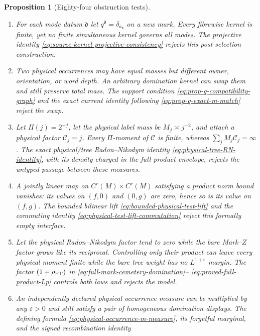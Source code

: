 \documentclass[11pt]{article}
\newtheorem{proposition}[theorem]{Proposition}
\begin{document}
\begin{proposition}[Eighty-four obstruction tests]
\begin{enumerate}[label=\textup{(T\arabic*)}]
      not a bounded product test.  The uniform lift
      \eqref{eq:bounded-physical-test-lift} rejects this model.
\item For each mode datum $\mathfrak d$ let
      $q^{\mathfrak d}=\delta_{a_{\mathfrak d}}$ on a new mark.  Every
      fibrewise kernel is finite, yet no finite simultaneous kernel governs
      all modes.  The projective identity
      \eqref{eq:source-kernel-projective-consistency} rejects this
      post-selection construction.
\item Two physical occurrences may have equal masses but different owner,
      orientation, or word depth.  An arbitrary domination kernel can swap
      them and still preserve total mass.  The support condition
      \eqref{eq:prop-q-compatibility-graph} and the exact current identity
      following \eqref{eq:prop-q-exact-m-match} reject the swap.
\item Let $\Pi(j)=2^{-j}$, let the physical label mass be
      $M_j\asymp j^{-2}$, and attach a physical factor $\mathcal C_j=j$.
      Every $\Pi$-moment of $\mathcal C$ is finite, whereas
      $\sum_jM_j\mathcal C_j=\infty$.  The exact physical/tree
      Radon--Nikodym identity \eqref{eq:physical-tree-RN-identity}, with its
      density charged in the full product envelope, rejects the untyped
      passage between these measures.
\item A jointly linear map on
      $C^r(M)\times C^r(M)$ satisfying a product norm bound vanishes: its
      values on $(f,0)$ and $(0,g)$ are zero, hence so is its value on
      $(f,g)$.  The bounded \emph{bilinear} lift
      \eqref{eq:bounded-physical-test-lift} and the commuting identity
      \eqref{eq:physical-test-lift-commutation} reject this formally empty
      interface.
\item Let the physical Radon--Nikodym factor tend to zero while the bare
      Mark--$Z$ factor grows like its reciprocal.  Controlling only their
      product can leave every physical moment finite while the bare tree
      weight has no $L^{1+\epsilon}$ margin.  The factor
      $(1+\rho_{\rm PT})$ in
      \eqref{eq:full-mark-cemetery-domination}--
      \eqref{eq:proved-full-product-Lp} controls both laws and rejects the
      model.
\item An independently declared physical occurrence measure can be
      multiplied by any $\varepsilon>0$ and still satisfy a pair of
      homogeneous domination displays.  The defining formula
      \eqref{eq:physical-occurrence-m-measure}, its forgetful marginal, and
      the signed recombination identity

\end{enumerate}
\end{proposition}
\end{document}
